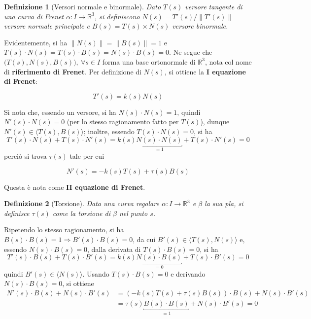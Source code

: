 \documentclass[12pt]{article}
\theoremstyle{style}
\newtheorem{definizione}{Definizione}[section]
\newenvironment{boxenv}[1][]{
    \begin{eqbox}[#1]
    }{
   \end{eqbox}
}
\numberwithin{equation}{subsection}
\renewcommand{\textbf}[1]{\textsf{\bfseries #1}}
\begin{document}
\begin{definizione}
	[Versori normale e binormale]
	Dato $T(s)$ versore tangente di una curva di Frenet $\alpha : I \to \mathbb{R}^3$, si definiscono $N(s) = T'(s) / \left\lVert T'(s) \right\rVert $ \textit{versore normale principale} e $B(s) = T(s) \times N(s)$ \textit{versore binormale}.
\end{definizione}
\noindent Evidentemente, si ha $\left\lVert N(s) \right\rVert =\left\lVert B(s) \right\rVert  = 1 $ e $T(s) \cdot N(s) = T(s) \cdot B(s) = N(s) \cdot B(s) =  0 $.
Ne segue che $\big(T(s),N(s),B(s)\big), \ \forall s \in I$ forma una base ortonormale di $\mathbb{R}^3$, nota col nome di \textbf{riferimento di Frenet}.
Per definizione di $N(s)$, si ottiene la \textbf{I equazione di Frenet}:
\begin{boxenv}[]
\begin{equation}
	T'(s) = k(s) N(s)
\end{equation}
\end{boxenv}
\noindent Si nota che, essendo un versore, si ha $N(s) \cdot N(s) = 1$, quindi $N'(s) \cdot N(s) = 0$ (per lo stesso ragionamento fatto per $T(s)$), dunque $N'(s) \in \langle T(s) , B(s) \rangle$; inoltre, essendo $T(s)\cdot N(s) = 0$, si ha 
\[
	T'(s) \cdot N(s) +T(s)\cdot  N'(s)=k(s) \underbracket{N(s) \cdot N(s)}_{=1}  +T(s)\cdot  N'(s) = 0 
\] 
perci\`o si trova $ \tau (s)$ tale per cui 
\begin{boxenv}[]
\begin{equation}
	N'(s) = -k(s)  T(s) + \tau (s)  B(s)
\end{equation}
\end{boxenv}
\noindent Questa \`e nota come \textbf{II equazione di Frenet}.
\begin{definizione}
	[Torsione]
	Data una curva regolare $\alpha :I\to\mathbb{R}^3$ e $\beta $ la sua pla, si definisce $\tau (s)$ come la \textit{torsione} di $\beta $ nel punto $s$.
\end{definizione}
\noindent Ripetendo lo stesso ragionamento, si ha $B(s) \cdot B(s) = 1 \Rightarrow B'(s) \cdot B(s) = 0$, da cui $B'(s) \in \langle T(s),N(s) \rangle$ e, essendo $N(s) \cdot B(s) = 0$, dalla derivata di $T(s) \cdot B(s) = 0$, si ha
\[
	T'(s) \cdot B(s) + T(s) \cdot B'(s) = k(s) \underbracket{N(s) \cdot B(s)}_{=0}  + T(s) \cdot B'(s) = 0
\] 
quindi $B'(s) \in \langle N(s) \rangle$.
Usando $T(s) \cdot B(s) = 0 $ e derivando $N(s) \cdot B(s) = 0$, si ottiene
\[
	\begin{split}
		N'(s) \cdot B(s) + N(s) \cdot B'(s) &= (- k(s) T(s) + \tau (s) B(s) )\cdot B(s) + N(s) \cdot B'(s) \\
		&= \tau (s) \underbracket{B(s)\cdot B(s)}_{=1}  + N(s)\cdot B'(s) = 0 
	\end{split}
\] 
\end{document}
